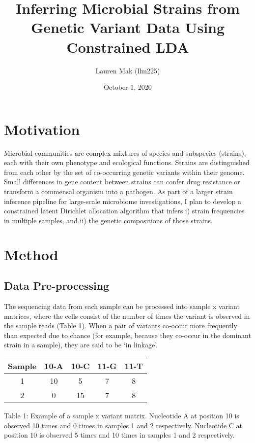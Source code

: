\documentclass{article}
\title{Inferring Microbial Strains from Genetic Variant Data Using Constrained LDA}
\author{Lauren Mak (llm225)}
\date{October 1, 2020}
\begin{document}
\maketitle


\section{Motivation}

Microbial communities are complex mixtures of species and subspecies (strains), each with their own phenotype and ecological functions. Strains are distinguished from each other by the set of co-occurring genetic variants within their genome. Small differences in gene content between strains can confer drug resistance or transform a commensal organism into a pathogen. As part of a larger strain inference pipeline for large-scale microbiome investigations, I plan to develop a constrained latent Dirichlet allocation algorithm that infers i) strain frequencies in multiple samples, and ii) the genetic compositions of those strains.

\section{Method}

\subsection{Data Pre-processing}

The sequencing data from each sample can be processed into sample x variant matrices, where the cells consist of the number of times the variant is observed in the sample reads (Table 1). When a pair of variants co-occur more frequently than expected due to chance (for example, because they co-occur in the dominant strain in a sample), they are said to be ‘in linkage’. 

\begin{center}
 \begin{tabular}{|c c c c c|} 
 \hline
 Sample & 10-A & 10-C & 11-G & 11-T \\ 
 \hline\hline
 1 & 10 & 5 & 7 & 8 \\ 
 2 & 0 & 15 & 7 & 8 \\ 
 \hline
 \end{tabular}
\end{center}
Table 1: Example of a sample x variant matrix. Nucleotide A at position 10 is observed 10 times and 0 times in samples 1 and 2 respectively. Nucleotide C at position 10 is observed 5 times and 10 times in samples 1 and 2 respectively. 
\end{document}
